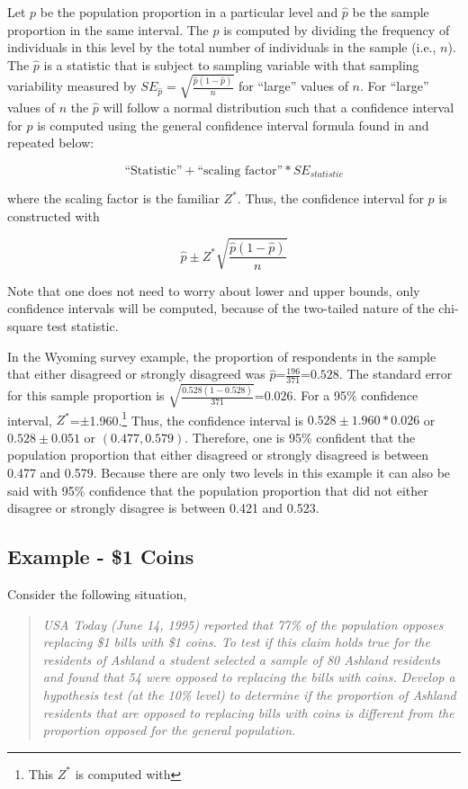 \documentclass[10pt,openany]{book}\usepackage[]{graphicx}\usepackage[]{color}
\begin{document}
Let $p$ be the population proportion in a particular level and $\hat{p}$ be the sample proportion in the same interval.  The $\hat{p}$ is computed by dividing the frequency of individuals in this level by the total number of individuals in the sample (i.e., $n$).  The $\hat{p}$ is a statistic that is subject to sampling variable with that sampling variability measured by $SE_{\hat{p}}=\sqrt{\frac{\hat{p}(1-\hat{p})}{n}}$ for ``large'' values of $n$.  For ``large'' values of $n$ the $\hat{p}$ will follow a normal distribution such that a confidence interval for $p$ is computed using the general confidence interval formula found in  and repeated below:

  \[ \text{``Statistic''} + \text{``scaling factor''} * SE_{statistic} \]

where the scaling factor is the familiar $Z^{*}$.  Thus, the confidence interval for $p$ is constructed with

  \[ \hat{p} \pm Z^{*}\sqrt{\frac{\hat{p}(1-\hat{p})}{n}} \]

Note that one does not need to worry about lower and upper bounds, only confidence intervals will be computed, because of the two-tailed nature of the chi-square test statistic.

In the Wyoming survey example, the proportion of respondents in the sample that either disagreed or strongly disagreed was $\hat{p}$=$\frac{196}{371}$=$0.528$.  The standard error for this sample proportion is $\sqrt{\frac{0.528(1-0.528)}{371}}$=$0.026$.  For a 95\% confidence interval, $Z^{*}$=$\pm$1.960.\footnote{This $Z^{*}$ is computed with } Thus, the confidence interval is $0.528 \pm 1.960*0.026$ or $0.528 \pm 0.051$ or $(0.477,0.579)$.  Therefore, one is 95\% confident that the population proportion that either disagreed or strongly disagreed is between 0.477 and 0.579.  Because there are only two levels in this example it can also be said with 95\% confidence that the population proportion that did not either disagree or strongly disagree is between 0.421 and 0.523.

\subsection{Example - \$1 Coins}
\vspace{-12pt}
Consider the following situation,
\vspace{-12pt}
\begin{quote}
\textsl{USA Today (June 14, 1995) reported that 77\% of the population opposes replacing \$1 bills with \$1 coins.  To test if this claim holds true for the residents of Ashland a student selected a sample of 80 Ashland residents and found that 54 were opposed to replacing the bills with coins.  Develop a hypothesis test (at the 10\% level) to determine if the proportion of Ashland residents that are opposed to replacing bills with coins is different from the proportion opposed for the general population.}
\end{quote}
\end{document}
